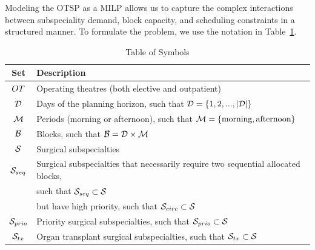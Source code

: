 Modeling the OTSP as a MILP allows us to capture the complex interactions between subspeciality demand, block capacity, and scheduling constraints in a structured manner.
To formulate the problem, we use the notation in Table~\ref{tab:symb}.
\begin{table}[t!]
    \centering
    \caption{\label{tab:symb}Table of Symbols}
    \scriptsize
    \begin{tabular}{cl}
    \toprule
    \textbf{Set}                    & \textbf{Description}                                                                       \\
    \midrule
        $OT$                       & Operating theatres (both elective and outpatient)                       \\
        $\mathcal{D}$            & Days of the planning horizon, such that $\mathcal{D} = \{1, 2, ..., |\mathcal{D}|\}$  \\
        $\mathcal{M}$                 & Periods (morning or afternoon), such that $\mathcal{M} = \{\text{morning}, \text{afternoon}\}$          \\
        $\mathcal{B}$                      & Blocks, such that $\mathcal{B} = \mathcal{D} \times \mathcal{M}$     \\
        $\mathcal{S}$                  & Surgical subspecialties                                                                \\
        $\mathcal{S}_{seq}$                 & Surgical subspecialties that necessarily require two sequential allocated blocks,\\
                                         & such that $\mathcal{S}_{seq} \subset \mathcal{S}$          \\
                                         & but have high priority, such that $\mathcal{S}_{circ} \subset \mathcal{S}$              \\
        $\mathcal{S}_{prio}$                & Priority surgical subspecialties, such that $\mathcal{S}_{prio} \subset \mathcal{S}$  \\
        $\mathcal{S}_{tx}$                & Organ transplant surgical subspecialties, such that $\mathcal{S}_{tx} \subset \mathcal{S}$                                                                                                              \\

\end{tabular}
\end{table}

